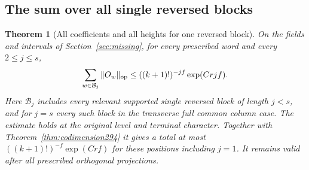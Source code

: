 \documentclass[a4paper,11pt]{article}
\newtheorem{theorem}[proposition]{Theorem}
\theoremstyle{definition}
\theoremstyle{remark}
\numberwithin{equation}{section}
\begin{document}
\subsection{The sum over all single reversed blocks}\label{nav:VII-57}
\begin{theorem}[All coefficients and all heights for one reversed block]\leavevmode
\label{thm:allblocks297}
On the fields and intervals of Section~\ref{sec:missing}, for every
prescribed word and every \(2\le j\le s\),
\[
                 \sum_{w\in\mathcal B_j}\|O_w\|_{\rm op}
                       \le ((k+1)!)^{-jf}\exp(Crjf).
\]
Here \(\mathcal B_j\) includes every relevant supported
single reversed block of length \(j<s\), and for \(j=s\)
every such block in the transverse full common column case.
The estimate holds at the original level and terminal character.
Together with Theorem~\ref{thm:codimension294} it gives a total
at most \(((k+1)!)^{-f}\exp(Crf)\) for these positions
including \(j=1\). It remains valid after all prescribed
orthogonal projections.
\end{theorem}
\end{document}
